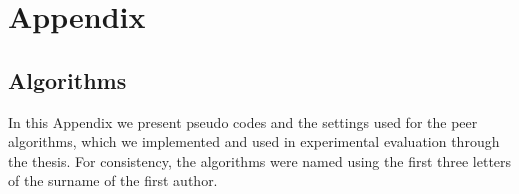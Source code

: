 \renewcommand{\thesection}{\alph{section}}
	
\chapter*{Appendix}
\label{cha:appendixA}



\renewcommand{\thefigure}{A.\arabic{figure}}   
\setcounter{figure}{0}
\renewcommand{\thetable}{A.\arabic{table}}
\setcounter{table}{0}

\section{Algorithms}

In this Appendix we present pseudo codes and the settings used for the peer algorithms, which we implemented and used in experimental evaluation through the thesis. For consistency, the algorithms were named using the first three letters of the surname of the first author.
